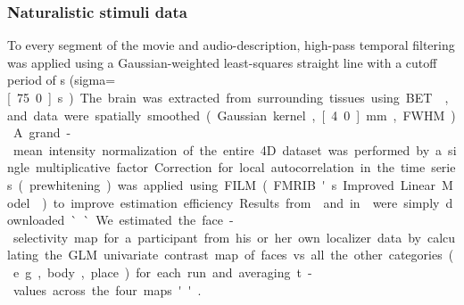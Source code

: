 \subsubsection{Naturalistic stimuli data}




To every segment of the movie and audio-description, high-pass temporal
filtering was applied using a Gaussian-weighted least-squares straight line with
a cutoff period of \unit[150]{s} (sigma=\unit[75.0]{s}).
The brain was extracted from surrounding tissues using BET \citep{smith2002bet},
and data were spatially smoothed (Gaussian kernel, \unit[4.0]{mm}, FWHM).
A grand-mean intensity normalization of the entire 4D dataset was performed by a
single multiplicative factor.
Correction for local autocorrelation in the time series (prewhitening) was
applied using FILM (FMRIB's Improved Linear Model \citep{woolrich2001autocorr})
to improve estimation efficiency.




%
Results from \citet{sengupta2016extension} and in
\citet{haeusler2022processing} were simply downloaded.
%
``We estimated the face-selectivity map for a participant from his or her own
localizer data by calculating the GLM univariate contrast map of faces vs. all
the other categories (e.g., body, place) for each run and averaging t-values
across the four maps'' \citep{jiahui2020predicting}.


